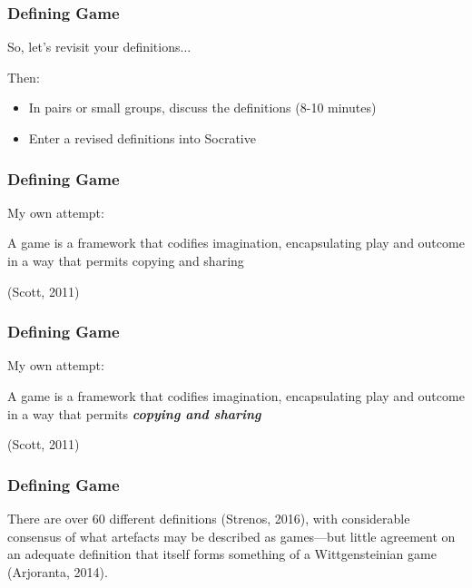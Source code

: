 \begin{frame}
	\frametitle{Defining Game}
	
	\socrative
	
	So, let's revisit your definitions...
	
	\vspace{1em}
	
	Then:
	
	\begin{itemize}
		\item In pairs or small groups, discuss the definitions (8-10 minutes)
		\item Enter a revised definitions into Socrative
		
	\end{itemize}

\end{frame}

\begin{frame}
	\frametitle{Defining Game}
	
	My own attempt:
		
	\begin{center}
	\begin{huge}
	A game is a framework that codifies imagination, encapsulating play and outcome in a way that permits copying and sharing
	\end{huge}
	
	\vspace{3em}
	
	(Scott, 2011)
	\end{center}

\end{frame}

\begin{frame}
	\frametitle{Defining Game}
	
	My own attempt:
		
	\begin{center}
	\begin{huge}
	A game is a framework that codifies imagination, encapsulating play and outcome in a way that permits \textbf{\textit{copying and sharing}}
	\end{huge}
	
	\vspace{3em}
	
	(Scott, 2011)
	\end{center}

\end{frame}

\begin{frame}
	\frametitle{Defining Game}
	
	There are over 60 different definitions (Strenos, 2016), with considerable consensus of what artefacts may be described as games---but little agreement on an adequate definition that itself forms something of a Wittgensteinian game (Arjoranta, 2014).

\end{frame}


